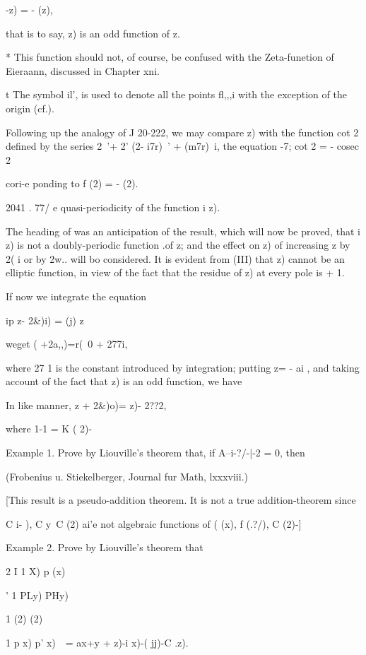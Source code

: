 {  -z) = - (z),

that is to say, z) is an odd function of z.

* This function should not, of course, be confused with the
Zeta-funetion of Eieraann, discussed in Chapter xni.

t The symbol il', is used to denote all the points fl,,,i with the
exception of the origin (cf.).

%
%

Following up the analogy of J 20-222, we may compare z) with the
function cot 2 defined by the series 2~'+ 2' (2- i7r)~' + (m7r)~i,
the equation -7; cot 2 = - cosec 2

cori-e ponding to f (2) = - (2).

2041 . 77/ e quasi-periodicity of the function i z).

The heading of was an anticipation of the result, which will
now be proved, that i z) is not a doubly-periodic function .of z; and
the effect on z) of increasing z by 2( i or by 2w.. will bo
considered. It is evident from (III) that z) cannot be an
elliptic function, in view of the fact that the residue of z) at every
pole is + 1.

If now we integrate the equation

ip z- 2\&)i) = (j) z\

weget ( +2a,,)=r(~0 + 277i,

where 27 1 is the constant introduced by integration; putting z= - ai
, and taking account of the fact that z) is an odd function, we have

In like manner, z + 2\&)o)= z)- 2??2,

where 1-1 = K ( 2)-

Example 1. Prove by Liouville's theorem that, if A--i-?/-|-2 = 0, then

(Frobenius u. Stiekelberger, Journal fur Math, lxxxviii.)

[This result is a pseudo-addition theorem. It is not a true
addition-theorem since

C i- ), C y\ C (2) ai'e not algebraic functions of ( (x), f (.?/), C
(2)-]

Example 2. Prove by Liouville's theorem that

2 I 1 X) p (x)

' 1 PLy) PHy)

1 (2) (2)

1 p x) p' x)\ \ = ax+y + z)-i x)-( jj)-C .z).

}
